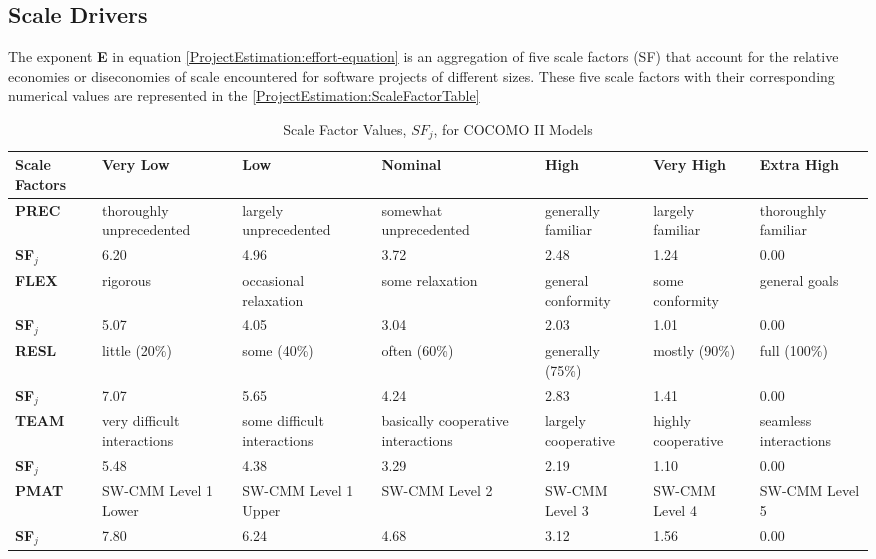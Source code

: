 \documentclass[\mainpath/main]{subfiles}
\begin{document}
\subsection{Scale Drivers}
The exponent \textbf{E} in equation \ref{ProjectEstimation:effort-equation} is an aggregation of five scale factors (SF) that account
for the relative economies or diseconomies of scale encountered for software projects of different
sizes. These five scale factors with their corresponding numerical values are represented in the \autoref{ProjectEstimation:ScaleFactorTable}

\clearpage

\begin{table}
	\caption{Scale Factor Values, $SF_{j}$, for COCOMO II Models}
	\label{ProjectEstimation:ScaleFactorTable}
	\footnotesize
\begin{tabular}{|C{1.2cm}|C{1.8cm}|C{1.8cm}|C{1.8cm}|C{1.8cm}|C{1.8cm}|C{1.8cm}|}
	\hline \textbf{Scale Factors} & \textbf{Very Low} & \textbf{Low} & \textbf{Nominal} & \textbf{High} & \textbf{Very High} & \textbf{Extra High} \\ 
	\hline \textbf{PREC} & thoroughly unprecedented & largely unprecedented & somewhat unprecedented & generally familiar & largely familiar & thoroughly familiar \\ 
		   \textbf{SF$_{j}$} & 6.20 & 4.96 & 3.72 & 2.48 & 1.24 & 0.00 \\ 
	\hline \textbf{FLEX} & rigorous & occasional relaxation & some relaxation & general conformity & some conformity & general goals \\ 
		   \textbf{SF$_{j}$} & 5.07 & 4.05 & 3.04 & 2.03 & 1.01 & 0.00 \\
	\hline \textbf{RESL} & little (20\%) & some (40\%) & often (60\%) & generally (75\%) & mostly (90\%) & full (100\%) \\ 
		   \textbf{SF$_{j}$} & 7.07 & 5.65 & 4.24 & 2.83 & 1.41 & 0.00 \\ 
	\hline \textbf{TEAM} & very difficult interactions & some difficult interactions & basically cooperative interactions & largely cooperative & highly cooperative & seamless interactions \\ 
		   \textbf{SF$_{j}$} & 5.48 & 4.38 & 3.29 & 2.19 & 1.10 & 0.00 \\
	\hline \textbf{PMAT} & SW-CMM Level 1 Lower & SW-CMM Level 1 Upper & SW-CMM Level 2 & SW-CMM Level 3 & SW-CMM Level 4 & SW-CMM Level 5 \\ 
		   \textbf{SF$_{j}$} & 7.80 & 6.24 & 4.68 & 3.12 & 1.56 & 0.00 \\
	\hline 
\end{tabular} 
\end{table}
\end{document}
